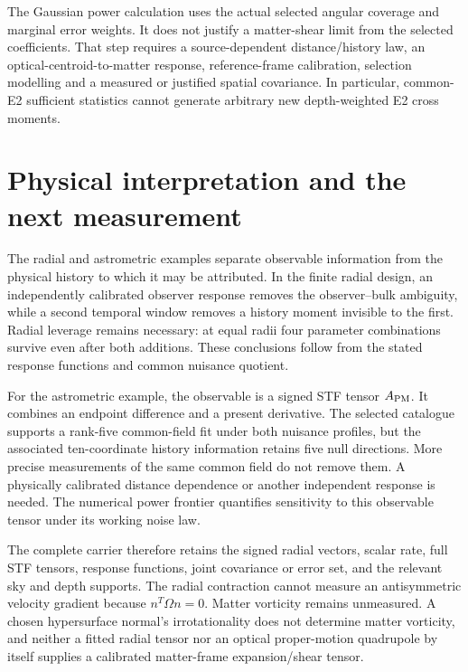The Gaussian power calculation uses the actual selected angular coverage and marginal error weights. It does not justify a matter-shear limit from the selected coefficients. That step requires a source-dependent distance/history law, an optical-centroid-to-matter response, reference-frame calibration, selection modelling and a measured or justified spatial covariance. In particular, common-E2 sufficient statistics cannot generate arbitrary new depth-weighted E2 cross moments.

\hypertarget{physical-interpretation-and-the-next-measurement}{%
\section{Physical interpretation and the next measurement}\label{physical-interpretation-and-the-next-measurement}}

The radial and astrometric examples separate observable information from the physical history to which it may be attributed. In the finite radial design, an independently calibrated observer response removes the observer--bulk ambiguity, while a second temporal window removes a history moment invisible to the first. Radial leverage remains necessary: at equal radii four parameter combinations survive even after both additions. These conclusions follow from the stated response functions and common nuisance quotient.

For the astrometric example, the observable is a signed STF tensor \(A_{\rm PM}\). It combines an endpoint difference and a present derivative. The selected catalogue supports a rank-five common-field fit under both nuisance profiles, but the associated ten-coordinate history information retains five null directions. More precise measurements of the same common field do not remove them. A physically calibrated distance dependence or another independent response is needed. The numerical power frontier quantifies sensitivity to this observable tensor under its working noise law.

The complete carrier therefore retains the signed radial vectors, scalar rate, full STF tensors, response functions, joint covariance or error set, and the relevant sky and depth supports. The radial contraction cannot measure an antisymmetric velocity gradient because \(n^T\Omega n=0\). Matter vorticity remains unmeasured. A chosen hypersurface normal's irrotationality does not determine matter vorticity, and neither a fitted radial tensor nor an optical proper-motion quadrupole by itself supplies a calibrated matter-frame expansion/shear tensor.

